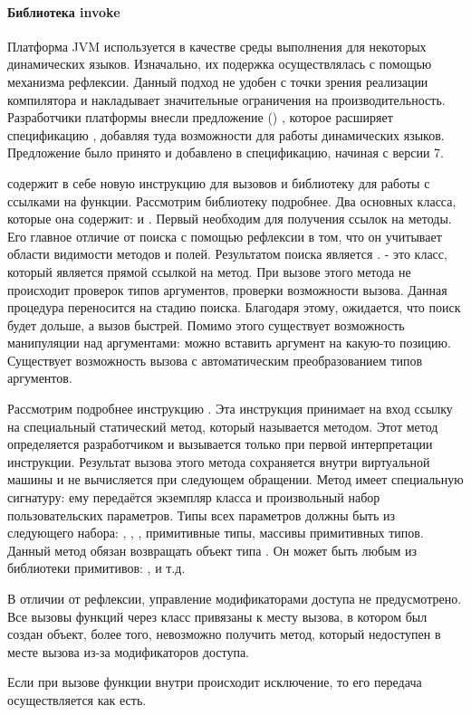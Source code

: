 \paragraph{Библиотека invoke}
  Платформа JVM используется в качестве среды выполнения для некоторых динамических языков. Изначально, их подержка осуществлялась с помощью механизма рефлексии. Данный подход не удобен с точки зрения реализации компилятора и накладывает значительные ограничения на производительность. Разработчики платформы внесли предложение () , которое расширяет спецификацию , добавляя туда возможности для работы динамических языков\cite{jvm:jsr292}. Предложение было принято и добавлено в спецификацию, начиная с версии 7.

 содержит в себе новую инструкцию для вызовов  и библиотеку для работы с ссылками на функции. Рассмотрим библиотеку подробнее. Два основных класса, которые она содержит:  и . Первый необходим для получения ссылок на методы. Его главное отличие от поиска с помощью рефлексии в том, что он учитывает области видимости методов и полей. Результатом поиска является .  - это класс, который является прямой ссылкой на метод. При вызове этого метода не происходит проверок типов аргументов, проверки возможности вызова. Данная процедура переносится на стадию поиска. Благодаря этому, ожидается, что поиск будет дольше, а вызов быстрей. Помимо этого существует возможность манипуляции над аргументами: можно вставить аргумент на какую-то позицию. Существует возможность вызова с автоматическим преобразованием типов аргументов.

Рассмотрим подробнее инструкцию . Эта инструкция принимает на вход ссылку на специальный статический метод, который называется  методом. Этот метод определяется разработчиком и вызывается только при первой интерпретации инструкции. Результат вызова этого метода сохраняется внутри виртуальной машины и не вычисляется при следующем обращении. Метод имеет специальную сигнатуру: ему передаётся экземпляр класса  и произвольный набор пользовательских параметров. Типы всех параметров должны быть из следующего набора: , , , примитивные типы, массивы примитивных типов. Данный метод обязан возвращать объект типа . Он может быть любым  из библиотеки примитивов: ,  и т.д.

В отличии от рефлексии, управление модификаторами доступа не предусмотрено. Все вызовы функций через класс  привязаны к месту вызова, в котором был создан  объект, более того, невозможно получить метод, который недоступен в месте вызова из-за модификаторов доступа.

Если при вызове функции внутри происходит исключение, то его передача осуществляется как есть.

